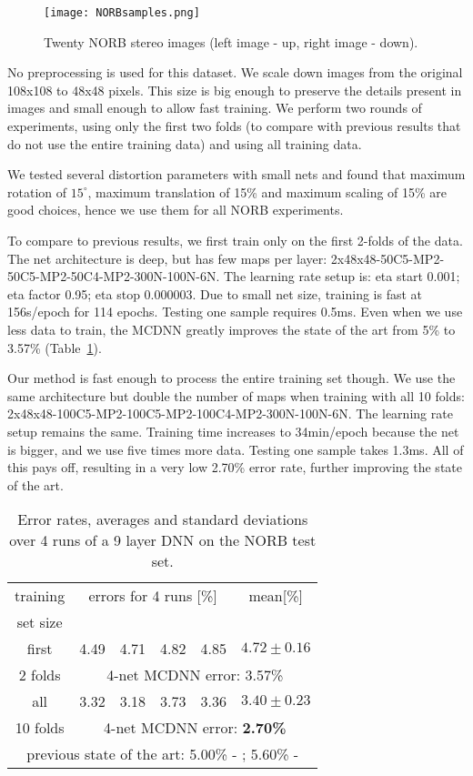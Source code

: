 \documentclass[a4paper]{article}
\begin{document}
\begin{figure}[ht!]
\hfill
\begin{center}
\texttt{[image: NORBsamples.png]}
\end{center}
\caption{Twenty NORB stereo images (left image - up, right image - down).}
\label{Fig:NORBsamples}
\end{figure}

No preprocessing is used for this dataset.  We scale down images from the original 108x108 to 48x48 pixels. This size is big enough to preserve the details present in images and small enough to allow fast training. We perform two rounds of experiments, using only the first two folds (to compare with previous results that do not use the entire training data) and using all training data.

We tested several distortion parameters with small nets and found that maximum rotation of $15^\circ$, maximum translation of 15\% and maximum scaling of 15\% are good choices, hence we use them for all NORB experiments.

To compare to previous results, we first train only on the first 2-folds of the data. The net architecture is deep, but has few maps per layer:  2x48x48-50C5-MP2-50C5-MP2-50C4-MP2-300N-100N-6N. The learning rate setup is: eta start 0.001; eta factor 0.95; eta stop 0.000003. Due to small net size, training is fast at 156s/epoch for 114 epochs. Testing one sample requires 0.5ms.  Even when we use less data to train, the MCDNN greatly improves the state of the art from 5\% to 3.57\% (Table~\ref{tab:NORBresults}).

Our method is fast enough to process the entire training set though. We use the same architecture but double the number of maps when training with all 10 folds: 2x48x48-100C5-MP2-100C5-MP2-100C4-MP2-300N-100N-6N. The learning rate setup remains the same. Training time increases to 34min/epoch because the net is bigger, and we use five times more data. Testing one sample takes 1.3ms. All of this pays off, resulting in a very low 2.70\% error rate, further improving the state of the art.

\begin{table}[!t]
\caption{Error rates, averages and standard deviations over 4 runs of a 9 layer DNN on the NORB  test set.}
\label{tab:NORBresults}
\centering
\begin{tabular}{c|cccc|c}
training	& \multicolumn{4}{c}{errors for 4 runs [\%]}				&	mean[\%]			\\
set size	&  \multicolumn{4}{c}{}		&				\\
\hline
first			&	4.49		&	4.71		&	4.82		&	4.85		&	$4.72\pm0.16$		\\
2 folds		& 	\multicolumn{5}{c}{4-net MCDNN error:	3.57\%}\\
\hline
all 			&	3.32		&	3.18		&	3.73		&	3.36		&	$3.40\pm0.23$		\\
10 folds		& 	\multicolumn{5}{c}{4-net MCDNN error:	{\bf 2.70\%}}\\
\hline
\hline
 \multicolumn{6}{c}{previous state of the art: 5.00\% - \cite{CoatesICML:2011}; 5.60\% - \cite{scherer:2010}}\\
\end{tabular}
\end{table}
\end{document}
